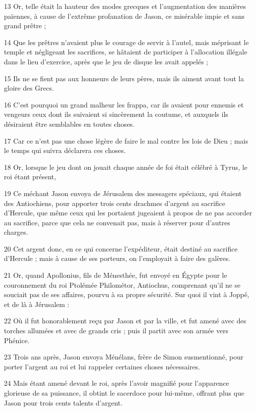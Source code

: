 \par 13 Or, telle était la hauteur des modes grecques et l'augmentation des manières païennes, à cause de l'extrême profanation de Jason, ce misérable impie et sans grand prêtre ;
\par 14 Que les prêtres n'avaient plus le courage de servir à l'autel, mais méprisant le temple et négligeant les sacrifices, se hâtaient de participer à l'allocation illégale dans le lieu d'exercice, après que le jeu de disque les avait appelés ;
\par 15 Ils ne se fient pas aux honneurs de leurs pères, mais ils aiment avant tout la gloire des Grecs.
\par 16 C'est pourquoi un grand malheur les frappa, car ils avaient pour ennemis et vengeurs ceux dont ils suivaient si sincèrement la coutume, et auxquels ils désiraient être semblables en toutes choses.
\par 17 Car ce n'est pas une chose légère de faire le mal contre les lois de Dieu ; mais le temps qui suivra déclarera ces choses.
\par 18 Or, lorsque le jeu dont on jouait chaque année de foi était célébré à Tyrus, le roi étant présent,
\par 19 Ce méchant Jason envoya de Jérusalem des messagers spéciaux, qui étaient des Antiochiens, pour apporter trois cents drachmes d'argent au sacrifice d'Hercule, que même ceux qui les portaient jugeaient à propos de ne pas accorder au sacrifice, parce que cela ne convenait pas, mais à réserver pour d'autres charges.
\par 20 Cet argent donc, en ce qui concerne l'expéditeur, était destiné au sacrifice d'Hercule ; mais à cause de ses porteurs, on l'employait à faire des galères.
\par 21 Or, quand Apollonius, fils de Ménesthée, fut envoyé en Égypte pour le couronnement du roi Ptolémée Philométor, Antiochus, comprenant qu'il ne se souciait pas de ses affaires, pourvu à sa propre sécurité. Sur quoi il vint à Joppé, et de là à Jérusalem :
\par 22 Où il fut honorablement reçu par Jason et par la ville, et fut amené avec des torches allumées et avec de grands cris ; puis il partit avec son armée vers Phénice.
\par 23 Trois ans après, Jason envoya Ménélans, frère de Simon susmentionné, pour porter l'argent au roi et lui rappeler certaines choses nécessaires.
\par 24 Mais étant amené devant le roi, après l'avoir magnifié pour l'apparence glorieuse de sa puissance, il obtint le sacerdoce pour lui-même, offrant plus que Jason pour trois cents talents d'argent.
